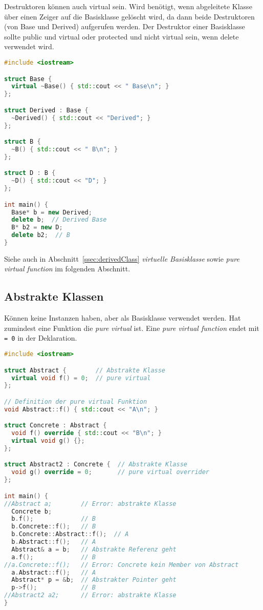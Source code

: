 Destruktoren können auch virtual sein. Wird benötigt, wenn abgeleitete Klasse
über einen Zeiger auf die Basisklasse gelöscht wird, da dann beide Destruktoren
(von Base und Derived) aufgerufen werden. Der Destruktor einer Basisklasse
sollte public und virtual oder protected und nicht virtual sein, wenn delete
verwendet wird.

\begin{lstlisting}[language=C++]
#include <iostream>

struct Base {
  virtual ~Base() { std::cout << " Base\n"; }
};

struct Derived : Base {
  ~Derived() { std::cout << "Derived"; }
};

struct B {
  ~B() { std::cout << " B\n"; }
};

struct D : B {
  ~D() { std::cout << "D"; }
};

int main() {
  Base* b = new Derived;
  delete b;  // Derived Base
  B* b2 = new D;
  delete b2;  // B
}
\end{lstlisting}

Siehe auch in Abschnitt~\ref{ssec:derivedClass} \emph{virtuelle Basisklasse}
sowie \emph{pure virtual function} im folgenden Abschnitt.

\subsection{Abstrakte Klassen}
\label{ssec:class.Abstract}

Können keine Instanzen haben, aber als Basisklasse verwendet werden. Hat
zumindest eine Funktion die \emph{pure virtual} ist. Eine \emph{pure virtual
function} endet mit \lstinline|= 0| in der Deklaration.

\begin{lstlisting}[language=C++]
#include <iostream>

struct Abstract {        // Abstrakte Klasse
  virtual void f() = 0;  // pure virtual
};

// Definition der pure virtual Funktion
void Abstract::f() { std::cout << "A\n"; }

struct Concrete : Abstract {
  void f() override { std::cout << "B\n"; }
  virtual void g() {};
};

struct Abstract2 : Concrete {  // Abstrakte Klasse
  void g() override = 0;       // pure virtual overrider
};

int main() {
//Abstract a;        // Error: abstrakte Klasse
  Concrete b;
  b.f();             // B
  b.Concrete::f();   // B
  b.Concrete::Abstract::f();  // A
  b.Abstract::f();   // A
  Abstract& a = b;   // Abstrakte Referenz geht
  a.f();             // B
//a.Concrete::f();   // Error: Concrete kein Member von Abstract
  a.Abstract::f();   // A
  Abstract* p = &b;  // Abstrakter Pointer geht
  p->f();            // B
//Abstract2 a2;      // Error: abstrakte Klasse
}
\end{lstlisting}

